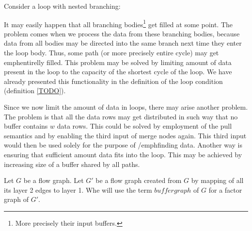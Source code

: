   Consider a loop with nested branching:


  It may easily happen that all branching bodies\footnote{More precisely their input buffers.} get filled at some point. The problem comes when we process the data from these branching bodies, because data from all bodies may be directed into the same branch next time they enter the loop body. Thus, some path (or more precisely entire cycle) may get emph{entirelly} filled. This problem may be solved by limiting amount of data present in the loop to the capacity of the shortest cycle of the loop. We have already presented this functionality in the definition of the loop condition (definition \ref{TODO}). 

  Since we now limit the amount of data in loops, there may arise another problem. The problem is that all the data rows may get distributed in such way that no buffer contains $w$ data rows. This could be solved by employment of the pull semantics and by enabling the third input of merge nodes again. This third input would then be used solely for the purpose of /emph{finding} data. Another way is ensuring that sufficient amount data fits into the loop. This may be achieved by increasing size of a buffer shared by all paths.

\begin{define}
  Let $G$ be a flow graph. Let $G'$ be a flow graph created from $G$ by mapping of all its layer 2 edges to layer 1.
  Whe will use the term $buffer graph$ of $G$ for a factor graph of $G'$.
\end{define}


